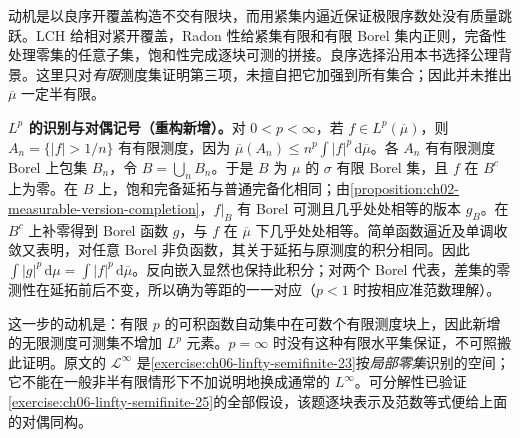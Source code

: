 \documentclass[../../main.tex]{subfiles}
\begin{document}
\begin{remark}
动机是以良序开覆盖构造不交有限块，而用紧集内逼近保证极限序数处没有质量跳跃。LCH 给相对紧开覆盖，Radon 性给紧集有限和有限 Borel 集内正则，完备性处理零集的任意子集，饱和性完成逐块可测的拼接。良序选择沿用本书选择公理背景。这里只对\emph{有限}测度集证明第三项，未擅自把它加强到所有集合；因此并未推出 $\overline\mu$ 一定半有限。
\end{remark}
\begin{remark}
\textbf{$L^p$ 的识别与对偶记号（重构新增）。}对 $0<p<\infty$，若 $f\in L^p(\overline\mu)$，则 $A_n=\{|f|>1/n\}$ 有有限测度，因为 $\overline\mu(A_n)\leqslant n^p\int|f|^p\,\mathrm d\overline\mu$。各 $A_n$ 有有限测度 Borel 上包集 $B_n$，令 $B=\bigcup_nB_n$。于是 $B$ 为 $\mu$ 的 $\sigma$ 有限 Borel 集，且 $f$ 在 $B^c$ 上为零。在 $B$ 上，饱和完备延拓与普通完备化相同；由\cref{proposition:ch02-measurable-version-completion}，$f|_B$ 有 Borel 可测且几乎处处相等的版本 $g_B$。在 $B^c$ 上补零得到 Borel 函数 $g$，与 $f$ 在 $\overline\mu$ 下几乎处处相等。简单函数逼近及单调收敛又表明，对任意 Borel 非负函数，其关于延拓与原测度的积分相同。因此 $\int|g|^p\,\mathrm d\mu=\int|f|^p\,\mathrm d\overline\mu$。反向嵌入显然也保持此积分；对两个 Borel 代表，差集的零测性在延拓前后不变，所以确为等距的一一对应（$p<1$ 时按相应准范数理解）。

这一步的动机是：有限 $p$ 的可积函数自动集中在可数个有限测度块上，因此新增的无限测度可测集不增加 $L^p$ 元素。$p=\infty$ 时没有这种有限水平集保证，不可照搬此证明。原文的 $\mathcal L^\infty$ 是\cref{exercise:ch06-linfty-semifinite-23}按\emph{局部零集}识别的空间；它不能在一般非半有限情形下不加说明地换成通常的 $L^\infty$。可分解性已验证\cref{exercise:ch06-linfty-semifinite-25}的全部假设，该题逐块表示及范数等式便给上面的对偶同构。
\end{remark}

\end{document}
